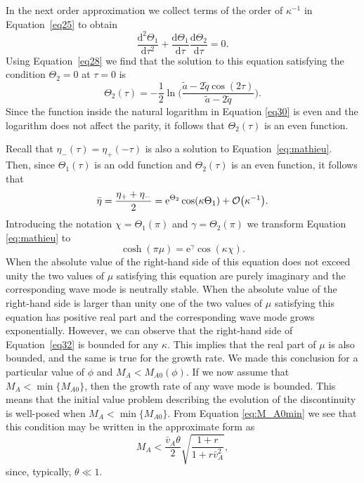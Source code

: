 In the next order approximation we collect terms of the order of $\kappa^{-1}$ in Equation~\eqref{eq25} to obtain
%
\begin{equation}
\label{eq29}
\frac{\mathrm{d}^2\Theta_1}{\mathrm{d}\tau^2} + 
\frac{\mathrm{d}\Theta_1}{\mathrm{d}\tau}
\frac{\mathrm{d}\Theta_2}{\mathrm{d}\tau} = 0. 
\end{equation}
%
Using Equation~\eqref{eq28} we find that the solution to this equation satisfying the condition $\Theta_2 = 0$ at $\tau = 0$ is
%
\begin{equation}
\label{eq30}
\Theta_2 (\tau) = -\frac{1}{2} \ln \bigg( \frac{\tilde{a} - 2\tilde{q}\cos(2\tau)}{\tilde{a} - 2\tilde{q}} \bigg).
\end{equation}
%
Since the function inside the natural logarithm in Equation \eqref{eq30} is even and the logarithm does not affect the parity, it follows that $\Theta_2(\tau)$ is an even function.

Recall that $\eta_-(\tau) = \eta_+(-\tau)$ is also a solution to Equation~\eqref{eq:mathieu}. Then, since $\Theta_1(\tau)$ is an odd function and $\Theta_2(\tau)$ is an even function, it follows that 
%
\begin{equation}
\label{eq31}
\bar\eta = \frac{\eta_+ + \eta_-}2 = 
\mathrm{e}^{\Theta_2}\cos(\kappa\Theta_1) + {\cal O}\big(\kappa^{-1}\big).
\end{equation}
% 
Introducing the notation $\chi = \Theta_1(\pi)$ and $\gamma = \Theta_2(\pi)$ we transform Equation \eqref{eq:mathieu} to
%
\begin{equation}
\label{eq32}
\cosh(\pi\mu) = \mathrm{e}^\gamma\cos(\kappa\chi).
\end{equation}
%
When the absolute value of the right-hand side of this equation does not exceed unity the two values of $\mu$ satisfying this equation are purely imaginary and the corresponding wave mode is neutrally stable. When the absolute value of the right-hand side is larger than unity one of the two values of $\mu$ satisfying this equation has positive real part and the corresponding wave mode grows exponentially.
However, we can observe that the right-hand side of Equation~\eqref{eq32} is bounded for any $\kappa$.
This implies that the real part of $\mu$ is also bounded, and the same is true for the growth rate.
We made this conclusion for a particular value of $\phi$ and $M_A < M_{A0}(\phi)$.
If we now assume that $M_A < \min \{ M_{A0} \}$, then the growth rate of any wave mode is bounded.
This means that the initial value problem describing the evolution of the discontinuity is well-posed when $M_A < \min \{ M_{A0} \}$.
From Equation \eqref{eq:M_A0min} we see that this condition may be written in the approximate form as
%
\begin{equation}
\label{eq33}
M_A < \frac{\bar v_A\theta}2\sqrt{\frac{1 + r}{1 + r \bar v_A^2}}, 
\end{equation}
%
since, typically, $\theta \ll 1$.

